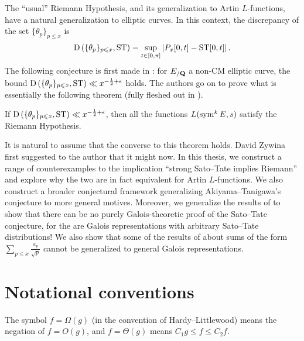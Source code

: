 The ``usual'' Riemann Hypothesis, and its generalization to Artin 
$L$-functions, have a natural generalization to elliptic curves. In this 
context, the discrepancy of the set $\{\theta_p\}_{p\leqslant x}$ is 
\[
	\operatorname{D}\left(\{\theta_p\}_{p\leqslant x},\mathrm{ST}\right) = \sup_{t\in [0,\pi]} \left| P_x[0,t] - \mathrm{ST}[0,t]\right| .
\]
The following conjecture is first made in \cite{akiyama-tanigawa-1999}: for 
$E_{/\mathbf{Q}}$ a non-CM elliptic curve, the bound 
$\operatorname{D}\left(\{\theta_p\}_{p\leqslant x},\mathrm{ST}\right)\ll x^{-\frac 1 2+\epsilon}$ 
holds. The authors go on to prove what is essentially the following theorem 
(fully fleshed out in \cite{mazur-2008}). 

\begin{theorem}
If $\operatorname{D}\left(\{\theta_p\}_{p\leqslant x},\mathrm{ST}\right)\ll x^{-\frac 1 2+\epsilon}$, 
then all the functions $L(\operatorname{sym}^k E, s)$ satisfy the Riemann Hypothesis. 
\end{theorem}

It is natural to assume that the converse to this theorem holds. David Zywina 
first suggested to the author that it might now. In this thesis, we construct a 
range of counterexamples to the implication ``strong Sato--Tate implies 
Riemann'' and explore why the two are in fact equivalent for Artin 
$L$-functions. We also construct a broader conjectural framework generalizing 
Akiyama--Tanigawa's conjecture to more general motives. Moreover, we generalize 
the results of \cite{pande-2011} to show that there can be no purely 
Galois-theoretic proof of the Sato--Tate conjecture, for the are Galois 
representations with arbitrary Sato--Tate distributions! We also show that 
some of the results of \cite{sarnak-2007} about sums of the form 
$\sum_{p\leqslant x} \frac{a_p}{\sqrt p}$ cannot be generalized to general 
Galois representations. 





\section{Notational conventions}

The symbol $f=\Omega(g)$ (in the convention of Hardy--Littlewood) means 
the negation of $f = O(g)$, and $f = \Theta(g)$ means 
$C_1 g \leqslant f \leqslant C_2 f$. 
